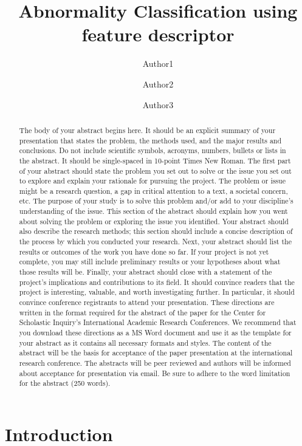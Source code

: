 \documentclass{article}
\author[1]{Author1 \orcidaffil{0000-0000-0000-0000}}
\author[1]{Author2 \orcidaffil{0000-0000-0000-0000}}
\author[2]{Author3 \orcidaffil{0000-0000-0000-0000}}
\affil[1]{Author Affiliation1}
\affil[2]{Author Affiliation2}
\affil[ ]{\textit {\{email1,email2,email3,email4,email5\}@xyz.edu}}
\begin{document}
	\title{Abnormality Classification using feature descriptor}	
	
	\maketitle
	
	\begin{abstract}
		The body of your abstract begins here. It should be an explicit summary of your presentation that
		states the problem, the methods used, and the major results and conclusions. Do not include scientific symbols,
		acronyms, numbers, bullets or lists in the abstract. It should be single-spaced in 10-point Times New Roman.
		The first part of your abstract should state the problem you set out to solve or the issue you set out to explore
		and explain your rationale for pursuing the project. The problem or issue might be a research question, a gap in
		critical attention to a text, a societal concern, etc. The purpose of your study is to solve this problem and/or add
		to your discipline’s understanding of the issue. This section of the abstract should explain how you went about
		solving the problem or exploring the issue you identified. Your abstract should also describe the research
		methods; this section should include a concise description of the process by which you conducted your research.
		Next, your abstract should list the results or outcomes of the work you have done so far. If your project is not
		yet complete, you may still include preliminary results or your hypotheses about what those results will
		be. Finally, your abstract should close with a statement of the project’s implications and contributions to its
		field. It should convince readers that the project is interesting, valuable, and worth investigating further. In
		particular, it should convince conference registrants to attend your presentation. These directions are written in
		the format required for the abstract of the paper for the Center for Scholastic Inquiry’s International Academic
		Research Conferences. We recommend that you download these directions as a MS Word document and use it
		as the template for your abstract as it contains all necessary formats and styles. The content of the abstract will
		be the basis for acceptance of the paper presentation at the international research conference. The abstracts will
		be peer reviewed and authors will be informed about acceptance for presentation via email. Be sure to adhere to
		the word limitation for the abstract (250 words).
	\end{abstract}
	
	\section{Introduction}
	
	
	 
	 
	
	\appendix
\end{document}
